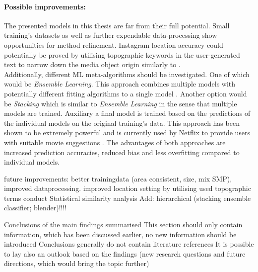 \paragraph{Possible improvements:} The presented models in this thesis are far from their full potential. Small training's datasets as well as further expendable data-processing show opportunities for method refinement. Instagram location accuracy could potentially be proved by utilising topographic keywords in the user-generated text to narrow down the media object origin similarly to \parencite{Ostermann2015}. \\
Additionally, different ML meta-algorithms should be investigated. One of which would be \textit{Ensemble Learning}. This approach combines multiple models with potentially different fitting algorithms to a single model \parencite{Zhou2009}. Another option would be \textit{Stacking} which is similar to \textit{Ensemble Learning} in the sense that multiple models are trained. Auxiliary a final model is trained based on the predictions of the individual models on the original training's data. This approach has been shown to be extremely powerful and is currently used by Netflix to provide users with suitable movie suggestions \parencite{AndreasToscher2009}. The advantages of both approaches are increased prediction accuracies, reduced bias and less overfitting compared to individual models. 



future improvements: better trainingdata (area consistent, size, mix SMP), improved dataprocessing. improved location setting by utilising used topographic terms
conduct Statistical similarity analysis
Add: hierarchical (stacking ensemble classifier; blender)!!!!

    Conclusions of the main findings summarised
    This section should only contain information, which has been discussed earlier, no new information should be introduced
    Conclusions generally do not contain literature references
    It is possible to lay also an outlook based on the findings (new research questions and future directions, which would bring the topic further)


